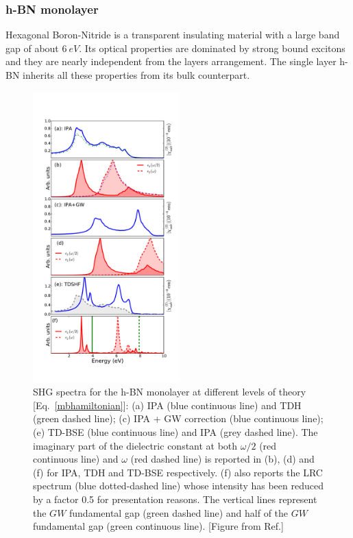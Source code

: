 \subsubsection{h-BN monolayer}
Hexagonal Boron-Nitride is a transparent insulating material with a large band gap of about $6~eV$. Its optical properties are dominated by strong bound excitons and they are nearly independent from the layers arrangement.\cite{PhysRevLett.96.126104,PhysRevLett.100.189701} The single layer h-BN inherits all these properties from its bulk counterpart.
\begin{figure}[H]
    \vspace{-0.32cm}
    \centering
\includegraphics[width=0.5\textwidth]{Figures/eps_and_X2}
    \vspace{-0.85cm}
\caption{\footnotesize{SHG spectra for the h-BN monolayer at different levels of theory [Eq.~\eqref{mbhamiltonian}]: (a) IPA (blue continuous line) and TDH (green dashed line); (c) IPA + GW correction (blue continuous line); (e) TD-BSE (blue continuous line) and IPA (grey dashed line). The imaginary part of the dielectric constant at both $\omega/2$ (red continuous line) and $\omega$ (red dashed line) is reported in (b), (d) and (f) for IPA, TDH and TD-BSE respectively. (f) also reports the LRC spectrum (blue dotted-dashed line) whose intensity has been reduced by a factor 0.5 for presentation reasons. The vertical lines represent the $GW$ fundamental gap (green dashed line) and half of the $GW$ fundamental gap (green continuous line). \label{absX2bn} [Figure from Ref.\cite{PhysRevB.89.081102}]}}
\end{figure}


